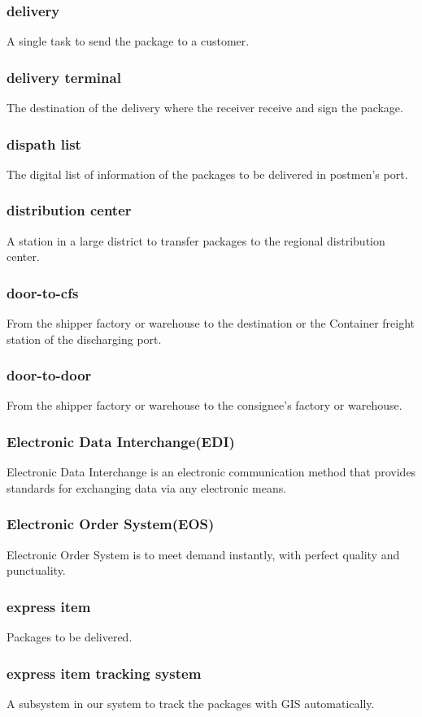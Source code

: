 \documentclass[12pt]{scrreprt}
\begin{document}
\begin{spacing}{0.7}
\subsubsection{delivery}
A single task to send the package to a customer.
\subsubsection{delivery terminal}
The destination of the delivery where the receiver receive and sign the package.
\subsubsection{dispath list}
The digital list of information of the packages to be delivered in
postmen’s port.
\subsubsection{distribution center}
A station in a large district to transfer packages to the regional
distribution center.
\subsubsection{door-to-cfs}
From the shipper factory or warehouse to the destination or the
Container freight station of the discharging port.
\subsubsection{door-to-door}
From the shipper factory or warehouse to the consignee's factory
or warehouse.
\subsubsection{Electronic Data Interchange(EDI)}
Electronic Data Interchange is an electronic communication method that provides
standards for exchanging data via any electronic means.
\subsubsection{Electronic Order System(EOS)}
Electronic Order System is to meet demand instantly,
with perfect quality and punctuality.
\subsubsection{express item}
Packages to be delivered.
\subsubsection{express item tracking system}
A subsystem in our system to track the packages with GIS automatically.

\end{spacing}
\end{document}
